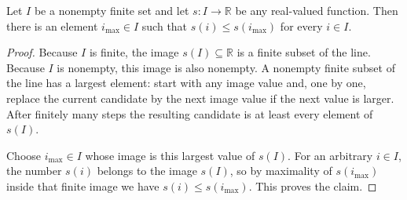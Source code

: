 \begin{helper}
Let $I$ be a nonempty finite set and let $s:I\to\mathbb R$ be any real-valued
function.  Then there is an element $i_{\max}\in I$ such that
$s(i)\le s(i_{\max})$ for every $i\in I$.
\end{helper}
\begin{proof}
Because $I$ is finite, the image $s(I)\subseteq\mathbb R$ is a finite subset
of the line.  Because $I$ is nonempty, this image is also nonempty.  A
nonempty finite subset of the line has a largest element: start with any
image value and, one by one, replace the current candidate by the next image
value if the next value is larger.  After finitely many steps the resulting
candidate is at least every element of $s(I)$.

Choose $i_{\max}\in I$ whose image is this largest value of $s(I)$.  For an
arbitrary $i\in I$, the number $s(i)$ belongs to the image $s(I)$, so by
maximality of $s(i_{\max})$ inside that finite image we have
$s(i)\le s(i_{\max})$.  This proves the claim.
\end{proof}
